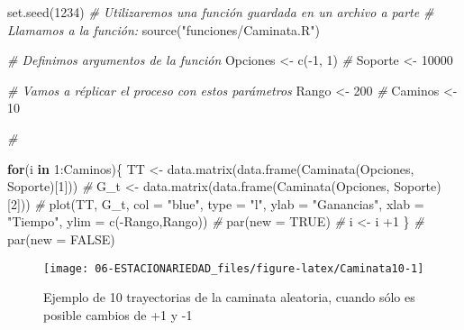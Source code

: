 \documentclass[
]{book}
\newenvironment{Shaded}{\begin{snugshade}}{\end{snugshade}}
\newcommand{\AttributeTok}[1]{\textcolor[rgb]{0.77,0.63,0.00}{#1}}
\newcommand{\CommentTok}[1]{\textcolor[rgb]{0.56,0.35,0.01}{\textit{#1}}}
\newcommand{\ConstantTok}[1]{\textcolor[rgb]{0.00,0.00,0.00}{#1}}
\newcommand{\ControlFlowTok}[1]{\textcolor[rgb]{0.13,0.29,0.53}{\textbf{#1}}}
\newcommand{\DecValTok}[1]{\textcolor[rgb]{0.00,0.00,0.81}{#1}}
\newcommand{\FunctionTok}[1]{\textcolor[rgb]{0.00,0.00,0.00}{#1}}
\newcommand{\NormalTok}[1]{#1}
\newcommand{\OtherTok}[1]{\textcolor[rgb]{0.56,0.35,0.01}{#1}}
\newcommand{\SpecialCharTok}[1]{\textcolor[rgb]{0.00,0.00,0.00}{#1}}
\newcommand{\StringTok}[1]{\textcolor[rgb]{0.31,0.60,0.02}{#1}}
\begin{document}
\begin{Shaded}
\begin{Highlighting}[]

\FunctionTok{set.seed}\NormalTok{(}\DecValTok{1234}\NormalTok{)}
\CommentTok{\# Utilizaremos una función guardada en un archivo a parte}
\CommentTok{\# Llamamos a la función:}
\FunctionTok{source}\NormalTok{(}\StringTok{"funciones/Caminata.R"}\NormalTok{)}

\CommentTok{\# Definimos argumentos de la función}
\NormalTok{Opciones }\OtherTok{\textless{}{-}} \FunctionTok{c}\NormalTok{(}\SpecialCharTok{{-}}\DecValTok{1}\NormalTok{, }\DecValTok{1}\NormalTok{)}
\CommentTok{\#}
\NormalTok{Soporte }\OtherTok{\textless{}{-}} \DecValTok{10000}

\CommentTok{\# Vamos a réplicar el proceso con estos parámetros}
\NormalTok{Rango }\OtherTok{\textless{}{-}} \DecValTok{200}
\CommentTok{\#}
\NormalTok{Caminos }\OtherTok{\textless{}{-}} \DecValTok{10}

\CommentTok{\#}

\ControlFlowTok{for}\NormalTok{(i }\ControlFlowTok{in} \DecValTok{1}\SpecialCharTok{:}\NormalTok{Caminos)\{}
\NormalTok{  TT }\OtherTok{\textless{}{-}} \FunctionTok{data.matrix}\NormalTok{(}\FunctionTok{data.frame}\NormalTok{(}\FunctionTok{Caminata}\NormalTok{(Opciones, Soporte)[}\DecValTok{1}\NormalTok{]))}
  \CommentTok{\#}
\NormalTok{  G\_t }\OtherTok{\textless{}{-}} \FunctionTok{data.matrix}\NormalTok{(}\FunctionTok{data.frame}\NormalTok{(}\FunctionTok{Caminata}\NormalTok{(Opciones, Soporte)[}\DecValTok{2}\NormalTok{]))}
  \CommentTok{\#}
  \FunctionTok{plot}\NormalTok{(TT, G\_t, }\AttributeTok{col =} \StringTok{"blue"}\NormalTok{, }\AttributeTok{type =} \StringTok{"l"}\NormalTok{, }\AttributeTok{ylab =} \StringTok{"Ganancias"}\NormalTok{, }\AttributeTok{xlab =} \StringTok{"Tiempo"}\NormalTok{, }\AttributeTok{ylim =} \FunctionTok{c}\NormalTok{(}\SpecialCharTok{{-}}\NormalTok{Rango,Rango))}
  \CommentTok{\#}
  \FunctionTok{par}\NormalTok{(}\AttributeTok{new =} \ConstantTok{TRUE}\NormalTok{)}
  \CommentTok{\#}
\NormalTok{  i }\OtherTok{\textless{}{-}}\NormalTok{ i }\SpecialCharTok{+}\DecValTok{1}
\NormalTok{\}}
\CommentTok{\#}
\FunctionTok{par}\NormalTok{(}\AttributeTok{new =} \ConstantTok{FALSE}\NormalTok{)}
\end{Highlighting}
\end{Shaded}

\begin{figure}

{\centering \texttt{[image: 06-ESTACIONARIEDAD\_files/figure-latex/Caminata10-1]} 

}

\caption{Ejemplo de 10 trayectorias de la caminata aleatoria, cuando sólo es posible cambios de +1 y -1}\label{fig:Caminata10}
\end{figure}
\end{document}
